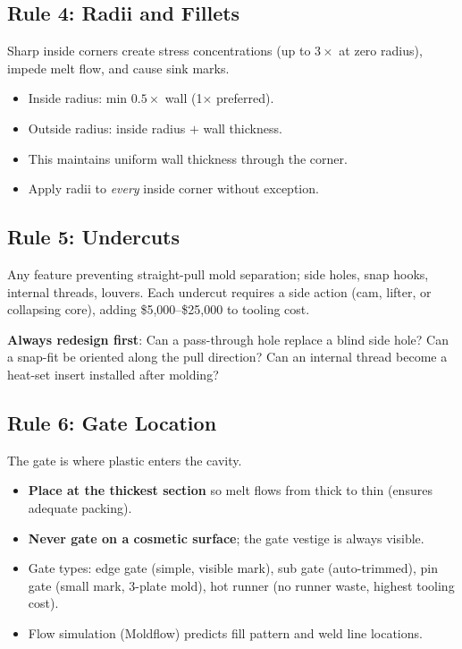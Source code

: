 \documentclass[11pt,letterpaper,twoside,openany]{book}
\begin{document}
\subsection{Rule 4: Radii and Fillets}

Sharp inside corners create stress concentrations (up to $3\times$ at zero radius), impede melt flow, and cause sink marks.

\begin{itemize}[nosep,leftmargin=1.5em]
  \item Inside radius: min $0.5\times$ wall (1$\times$ preferred).
  \item Outside radius: inside radius $+$ wall thickness.
  \item This maintains uniform wall thickness through the corner.
  \item Apply radii to \emph{every} inside corner without exception.
\end{itemize}

\subsection{Rule 5: Undercuts}

Any feature preventing straight-pull mold separation; side holes, snap hooks, internal threads, louvers. Each undercut requires a side action (cam, lifter, or collapsing core), adding \$5,000--\$25,000 to tooling cost.

\textbf{Always redesign first}: Can a pass-through hole replace a blind side hole? Can a snap-fit be oriented along the pull direction? Can an internal thread become a heat-set insert installed after molding?

\subsection{Rule 6: Gate Location}

The gate is where plastic enters the cavity.

\begin{itemize}[nosep,leftmargin=1.5em]
  \item \textbf{Place at the thickest section} so melt flows from thick to thin (ensures adequate packing).
  \item \textbf{Never gate on a cosmetic surface}; the gate vestige is always visible.
  \item Gate types: edge gate (simple, visible mark), sub gate (auto-trimmed), pin gate (small mark, 3-plate mold), hot runner (no runner waste, highest tooling cost).
  \item Flow simulation (Moldflow) predicts fill pattern and weld line locations.
\end{itemize}
\end{document}
